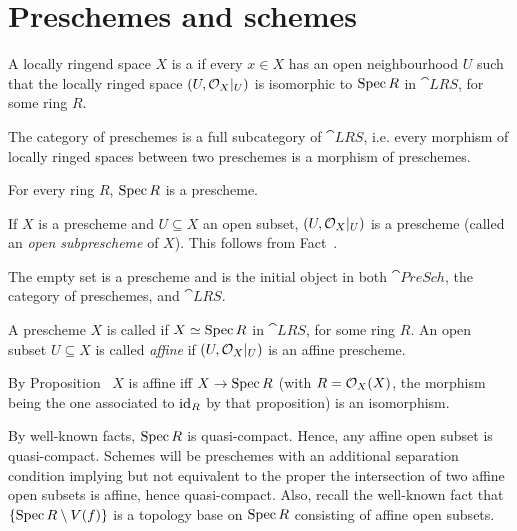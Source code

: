 \documentclass[a4paper,parskip=half,numbers=enddot, DIV=12]{scrreprt}
\begin{document}
\section{Preschemes and schemes}
\begin{defi} 
    A locally ringend space $X$ is a  if every $x\in X$ has an open neighbourhood $U$ such that the locally ringed space $(U,\mathcal{O}_X|_U)$ is isomorphic to $\operatorname{Spec} R$ in $\cat{LRS}$, for some ring $R$. 
    
    The category of preschemes is a full subcategory of $\cat{LRS}$, i.e. every morphism of locally ringed spaces between two preschemes is a morphism of preschemes.
\end{defi}
\begin{example}
    For every ring $R$, $\operatorname{Spec} R$ is a prescheme.
\end{example}
\begin{example}
    If $X$ is a prescheme and $U\subseteq X$ an open subset, $(U, \mathcal{O}_X|_U)$ is a prescheme (called an \emph{open subprescheme} of $X$). This follows from Fact~.
\end{example}
\begin{example*}
    The empty set is a prescheme and is the initial object in both $\cat{PreSch}$, the category of preschemes, and $\cat{LRS}$.
\end{example*}
\begin{defi}
    A prescheme $X$ is called  if $X\simeq \operatorname{Spec} R$ in $\cat{LRS}$, for some ring $R$. An open subset $U\subseteq X$ is called \emph{affine} if $(U,\mathcal{O}_X|_U)$ is an affine prescheme.
\end{defi}
\begin{rem*}
    By Proposition~ $X$ is affine iff $X\morphism \Spec R$ (with $R=\mathcal{O}_X(X)$, the morphism being the one associated to $\operatorname{id}_R$ by that proposition) is an isomorphism. 
\end{rem*}
\begin{rem*}
    By well-known facts, $\operatorname{Spec} R$ is quasi-compact. Hence, any affine open subset is quasi-compact. Schemes will be preschemes with an additional separation condition implying but not equivalent to the proper the intersection of two affine open subsets is affine, hence quasi-compact. Also, recall the well-known fact that $\left\{\operatorname{Spec} R\setminus V(f)\right\}$ is a topology base on $\operatorname{Spec} R$ consisting of affine open subsets. 
\end{rem*}
\end{document}

